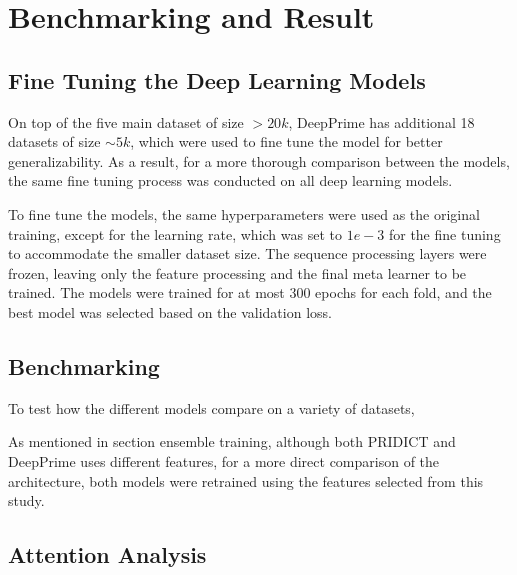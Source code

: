 \chapter{Benchmarking and Result}

\section{Fine Tuning the Deep Learning Models}

On top of the five main dataset of size $> 20k$, DeepPrime has additional 18 datasets of size $\sim5k$, which were used to fine tune the model for better generalizability. As a result, for a more thorough comparison between the models, the same fine tuning process was conducted on all deep learning models.

To fine tune the models, the same hyperparameters were used as the original training, except for the learning rate, which was set to $1e-3$ for the fine tuning to accommodate the smaller dataset size. The sequence processing layers were frozen, leaving only the feature processing and the final meta learner to be trained. The models were trained for at most 300 epochs for each fold, and the best model was selected based on the validation loss.

\section{Benchmarking}

To test how the different models compare on a variety of datasets, 

As mentioned in section {ensemble training}, although both PRIDICT and DeepPrime uses different features, for a more direct comparison of the architecture, both models were retrained using the features selected from this study.

\section{Attention Analysis}
\label{sec:attention_analysis}

